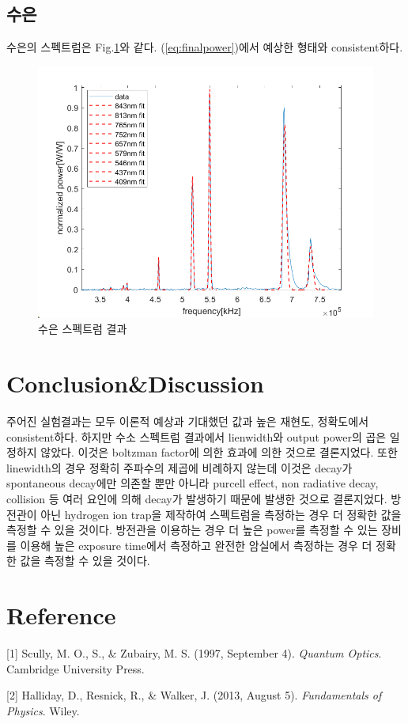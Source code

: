 \documentclass[%
 reprint,
 amsmath,amssymb,
 aps,
]{revtex4-2}
\begin{document}
\subsection{\label{sec:level2}수은}
수은의 스펙트럼은 Fig.\ref{fig:Mercury}와 같다. (\ref{eq:finalpower})에서 예상한 형태와 consistent하다.
\begin{figure}[htbp]
	\includegraphics[width = 0.95\linewidth]{Mercury.png}%
	\caption{\label{fig:Mercury}수은 스펙트럼 결과}
\end{figure}


\section{\label{sec:level1}Conclusion\&Discussion}
주어진 실험결과는 모두 이론적 예상과 기대했던 값과 높은 재현도, 정확도에서 consistent하다. 하지만 수소 스펙트럼 결과에서 lienwidth와 output power의 곱은 일정하지 않았다. 이것은 boltzman factor에 의한 효과에 의한 것으로 결론지었다. 또한 linewidth의 경우 정확히 주파수의 제곱에 비례하지 않는데 이것은 decay가 spontaneous decay에만 의존할 뿐만 아니라 purcell effect, non radiative decay, collision 등 여러 요인에 의해 decay가 발생하기 때문에 발생한 것으로 결론지었다. 방전관이 아닌 hydrogen ion trap을 제작하여 스펙트럼을 측정하는 경우 더 정확한 값을 측정할 수 있을 것이다. 방전관을 이용하는 경우 더 높은 power를 측정할 수 있는 장비를 이용해 높은 exposure time에서 측정하고 완전한 암실에서 측정하는 경우 더 정확한 값을 측정할 수 있을 것이다.

\section{\label{sec:level1}Reference}

[1] Scully, M. O., S., \& Zubairy, M. S. (1997, September 4). \textit{Quantum Optics}. Cambridge University Press.

[2] Halliday, D., Resnick, R., \& Walker, J. (2013, August 5). \textit{Fundamentals of Physics}. Wiley.
\end{document}
